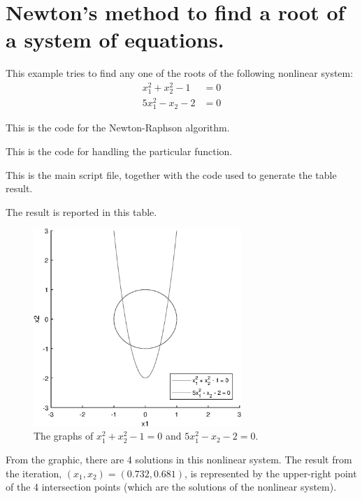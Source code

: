\documentclass{article}
\begin{document}
\section*{Newton's method to find a root of a system of equations.}

This example tries to find any one of the roots of the following nonlinear system:
\begin{align*}
    x_1^2 + x_2^2 - 1 &= 0 \\
    5x_1^2 - x_2 - 2 &= 0
\end{align*}

This is the code for the Newton-Raphson algorithm.



This is the code for handling the particular function.



This is the main script file, together with the code used to generate the table result.



The result is reported in this table.



\begin{figure}[h]
    \centering
    \includegraphics[width = 0.7\textwidth]{graph}
    \caption{The graphs of $x_1^2 + x_2^2 - 1 = 0$ and $5x_1^2 - x_2 - 2 = 0$.}
\end{figure}

From the graphic, there are 4 solutions in this nonlinear system. The result from the iteration, $(x_1,x_2) = (0.732,0.681)$, is represented by the upper-right point of the 4 intersection points (which are the solutions of the nonlinear system). 
\end{document}

